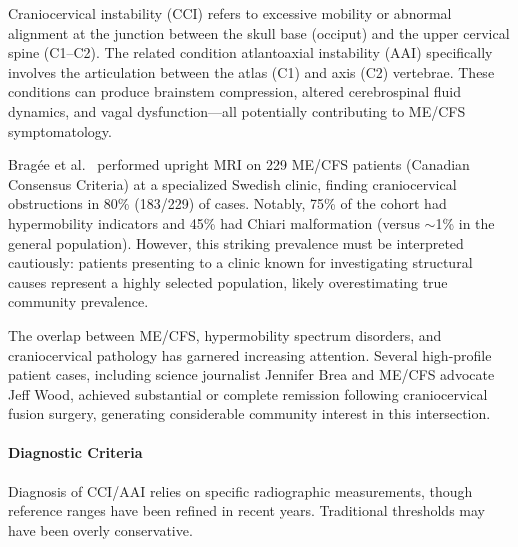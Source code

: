 Craniocervical instability (CCI) refers to excessive mobility or abnormal alignment at the junction between the skull base (occiput) and the upper cervical spine (C1--C2). The related condition atlantoaxial instability (AAI) specifically involves the articulation between the atlas (C1) and axis (C2) vertebrae. These conditions can produce brainstem compression, altered cerebrospinal fluid dynamics, and vagal dysfunction---all potentially contributing to ME/CFS symptomatology.

\begin{observation}
\label{obs:cci-prevalence}
Bragée et al.~\cite{Bragee2020} performed upright MRI on 229 ME/CFS patients (Canadian Consensus Criteria) at a specialized Swedish clinic, finding craniocervical obstructions in 80\% (183/229) of cases. Notably, 75\% of the cohort had hypermobility indicators and 45\% had Chiari malformation (versus $\sim$1\% in the general population). However, this striking prevalence must be interpreted cautiously: patients presenting to a clinic known for investigating structural causes represent a highly selected population, likely overestimating true community prevalence.
\end{observation}

The overlap between ME/CFS, hypermobility spectrum disorders, and craniocervical pathology has garnered increasing attention. Several high-profile patient cases, including science journalist Jennifer Brea and ME/CFS advocate Jeff Wood, achieved substantial or complete remission following craniocervical fusion surgery, generating considerable community interest in this intersection.

\paragraph{Diagnostic Criteria}

Diagnosis of CCI/AAI relies on specific radiographic measurements, though reference ranges have been refined in recent years. Traditional thresholds may have been overly conservative.

